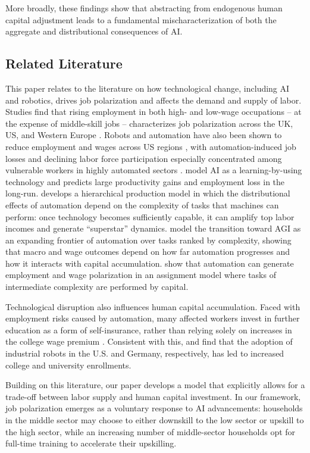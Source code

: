 \documentclass[12pt,english]{article}
\numberwithin{equation}{section}
\begin{document}
More broadly, these findings show that abstracting from endogenous human capital adjustment leads to a fundamental mischaracterization of both the aggregate and distributional consequences of AI.

\subsection{Related Literature}
This paper relates to the literature on how technological change, including AI and robotics, drives job polarization and affects the demand and supply of labor. Studies find that rising employment in both high- and low-wage occupations -- at the expense of middle-skill jobs -- characterizes job polarization across the UK, US, and Western Europe \parencites{Goos2007, Autor2013, Goos2014}. Robots and automation have also been shown to reduce employment and wages across US regions \parencite{Acemoglu2020}, with automation-induced job losses and declining labor force participation especially concentrated among vulnerable workers in highly automated sectors \parencites{Lerch2021, Faber2022}. \citet{wang_artificial_2025} model AI as a learning-by-using technology and predicts large productivity gains and employment loss in the long-run. \citet{Suh2023} develops a hierarchical production model in which the distributional effects of automation depend on the complexity of tasks that machines can perform: once technology becomes sufficiently capable, it can amplify top labor incomes and generate “superstar” dynamics. \citet{Korinek2024} model the transition toward AGI as an expanding frontier of automation over tasks ranked by complexity, showing that macro and wage outcomes depend on how far automation progresses and how it interacts with capital accumulation. \citet{acemoglu_automation_2026} show that automation can generate employment and wage polarization in an assignment model where tasks of intermediate complexity are performed by capital. 

Technological disruption also influences human capital accumulation. Faced with employment risks caused by automation, many affected workers invest in further education as a form of self-insurance, rather than relying solely on increases in the college wage premium \parencites{Atkin2016,Beaudry2016}. Consistent with this, \citet{DiGiacomo2023} and \citet{Dauth2021} find that the adoption of industrial robots in the U.S. and Germany, respectively, has led to increased college and university enrollments.

Building on this literature, our paper develops a model that explicitly allows for a trade-off between labor supply and human capital investment. In our framework, job polarization emerges as a voluntary response to AI advancements: households in the middle sector may choose to either downskill to the low sector or upskill to the high sector, while an increasing number of middle-sector households opt for full-time training to accelerate their upskilling.
\end{document}
